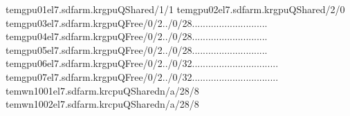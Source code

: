 \documentclass[a4paper,11pt,english]{sphinxmanual}
\begin{document}
\begin{sphinxVerbatim}[commandchars=\\\{\}]
tem\PYGZhy{}gpu01\PYGZhy{}el7.sdfarm.krgpuQShared/1/1\PYG{o}{[}\PYG{c+c1}{\PYGZsh{}.]        28/2/26  [\PYGZsh{}\PYGZsh{}..........................]}
tem\PYGZhy{}gpu02\PYGZhy{}el7.sdfarm.krgpuQShared/2/0\PYG{o}{[}\PYG{c+c1}{\PYGZsh{}\PYGZsh{}]        28/4/24  [\PYGZsh{}\PYGZsh{}\PYGZsh{}\PYGZsh{}........................]}
tem\PYGZhy{}gpu03\PYGZhy{}el7.sdfarm.krgpuQFree/0/2\PYG{o}{[}..\PYG{o}{]}/0/28\PYG{o}{[}............................\PYG{o}{]}
tem\PYGZhy{}gpu04\PYGZhy{}el7.sdfarm.krgpuQFree/0/2\PYG{o}{[}..\PYG{o}{]}/0/28\PYG{o}{[}............................\PYG{o}{]}
tem\PYGZhy{}gpu05\PYGZhy{}el7.sdfarm.krgpuQFree/0/2\PYG{o}{[}..\PYG{o}{]}/0/28\PYG{o}{[}............................\PYG{o}{]}
tem\PYGZhy{}gpu06\PYGZhy{}el7.sdfarm.krgpuQFree/0/2\PYG{o}{[}..\PYG{o}{]}/0/32\PYG{o}{[}................................\PYG{o}{]}
tem\PYGZhy{}gpu07\PYGZhy{}el7.sdfarm.krgpuQFree/0/2\PYG{o}{[}..\PYG{o}{]}/0/32\PYG{o}{[}................................\PYG{o}{]}
tem\PYGZhy{}wn1001\PYGZhy{}el7.sdfarm.krcpuQSharedn/a/28/8\PYG{o}{[}\PYG{c+c1}{\PYGZsh{}\PYGZsh{}\PYGZsh{}\PYGZsh{}\PYGZsh{}\PYGZsh{}\PYGZsh{}\PYGZsh{}\PYGZsh{}\PYGZsh{}\PYGZsh{}\PYGZsh{}\PYGZsh{}\PYGZsh{}\PYGZsh{}\PYGZsh{}\PYGZsh{}\PYGZsh{}\PYGZsh{}\PYGZsh{}\PYGZsh{}\PYGZsh{}\PYGZsh{}\PYGZsh{}\PYGZsh{}\PYGZsh{}\PYGZsh{}\PYGZsh{}........]}
tem\PYGZhy{}wn1002\PYGZhy{}el7.sdfarm.krcpuQSharedn/a/28/8\PYG{o}{[}\PYG{c+c1}{\PYGZsh{}\PYGZsh{}\PYGZsh{}\PYGZsh{}\PYGZsh{}\PYGZsh{}\PYGZsh{}\PYGZsh{}\PYGZsh{}\PYGZsh{}\PYGZsh{}\PYGZsh{}\PYGZsh{}\PYGZsh{}\PYGZsh{}\PYGZsh{}\PYGZsh{}\PYGZsh{}\PYGZsh{}\PYGZsh{}\PYGZsh{}\PYGZsh{}\PYGZsh{}\PYGZsh{}\PYGZsh{}\PYGZsh{}\PYGZsh{}\PYGZsh{}........]}

\end{sphinxVerbatim}
\end{document}
